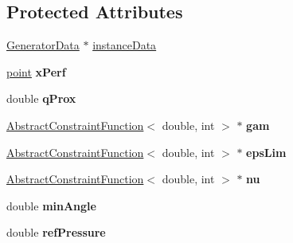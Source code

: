 \subsection*{Protected Attributes}
\begin{DoxyCompactItemize}
\item 
\hyperlink{class_generator_data}{Generator\+Data} $\ast$ \hyperlink{class_abstract_structured_c_c_o_tree_af1836d7ed2156f3cf9cc311edfdc49b1}{instance\+Data}
\item 
\hyperlink{structpoint}{point} {\bfseries x\+Perf}\hypertarget{class_abstract_structured_c_c_o_tree_a91bae86bcc7ea48856d8c2e4e7edb86b}{}\label{class_abstract_structured_c_c_o_tree_a91bae86bcc7ea48856d8c2e4e7edb86b}

\item 
double {\bfseries q\+Prox}\hypertarget{class_abstract_structured_c_c_o_tree_a11a4dfefc0d9e597f88c5a5fb90bde13}{}\label{class_abstract_structured_c_c_o_tree_a11a4dfefc0d9e597f88c5a5fb90bde13}

\item 
\hyperlink{class_abstract_constraint_function}{Abstract\+Constraint\+Function}$<$ double, int $>$ $\ast$ {\bfseries gam}\hypertarget{class_abstract_structured_c_c_o_tree_aade49db0f344bd2872f41455244667fa}{}\label{class_abstract_structured_c_c_o_tree_aade49db0f344bd2872f41455244667fa}

\item 
\hyperlink{class_abstract_constraint_function}{Abstract\+Constraint\+Function}$<$ double, int $>$ $\ast$ {\bfseries eps\+Lim}\hypertarget{class_abstract_structured_c_c_o_tree_a70cbbe2044e34b9ca4f77369bdfbf8c7}{}\label{class_abstract_structured_c_c_o_tree_a70cbbe2044e34b9ca4f77369bdfbf8c7}

\item 
\hyperlink{class_abstract_constraint_function}{Abstract\+Constraint\+Function}$<$ double, int $>$ $\ast$ {\bfseries nu}\hypertarget{class_abstract_structured_c_c_o_tree_a48e190d08356cb9a6d830d5231a8af40}{}\label{class_abstract_structured_c_c_o_tree_a48e190d08356cb9a6d830d5231a8af40}

\item 
double {\bfseries min\+Angle}\hypertarget{class_abstract_structured_c_c_o_tree_a73011b8853496a96d1be0578c5a21767}{}\label{class_abstract_structured_c_c_o_tree_a73011b8853496a96d1be0578c5a21767}

\item 
double {\bfseries ref\+Pressure}\hypertarget{class_abstract_structured_c_c_o_tree_a9caff71edb514f848fde54254c3a79dc}{}\label{class_abstract_structured_c_c_o_tree_a9caff71edb514f848fde54254c3a79dc}


\end{DoxyCompactItemize}
